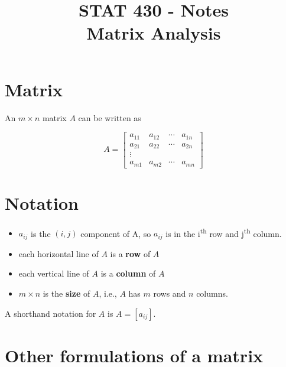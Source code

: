\documentclass[12pt]{article}
\title{STAT 430 - Notes \\
Matrix Analysis}
\theoremstyle{definition}
\begin{document}
\maketitle
\tableofcontents

\section{Matrix}


An $m \times n$ matrix $A$ can be written as

\[
A =
\begin{bmatrix}
a_{11} & a_{12} & \cdots & a_{1n} \\
a_{21} & a_{22} & \cdots & a_{2n} \\
\vdots & \\
a_{m1} & a_{m2} & \cdots & a_{mn}
\end{bmatrix}
\]

\section{Notation}

\begin{itemize}
\item $a_{ij}$ is the $(i, j)$ component of A, so $a_{ij}$ is in
the i\textsuperscript{th} row and j\textsuperscript{th} column.

\item each horizontal line of $A$ is a \textbf{row} of $A$
\item each vertical line of $A$ is a \textbf{column} of $A$
\item $m \times n$ is the \textbf{size} of $A$, i.e., $A$ has
$m$ rows and $n$ columns.
\end{itemize}

A shorthand notation for $A$ is $A = [a_{ij}]$.

\section{Other formulations of a matrix}
\end{document}

